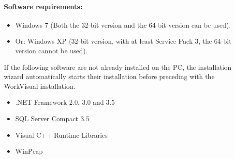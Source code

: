 			\paragraph{Software requirements:}
				\begin{itemize}
					\item Windows 7 (Both the 32-bit version and the 64-bit version can be used).
					\item Or: Windows XP (32-bit version, with at least Service Pack 3, the 64-bit version cannot be used).
				\end{itemize}
			If the following software are not already installed on the PC, the installation wizard automatically starts their installation before preceding with the WorkVisual installation.
				\begin{itemize}
					\item .NET Framework 2.0, 3.0 and 3.5
					\item SQL Server Compact 3.5
					\item Visual C++ Runtime Libraries
					\item WinPcap
				\end{itemize}
